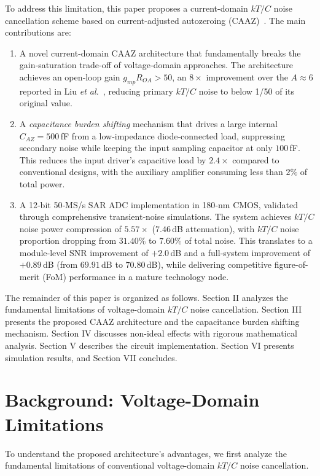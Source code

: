 \documentclass[journal]{IEEEtran}
\begin{document}
To address this limitation, this paper proposes a current-domain $kT/C$ noise cancellation scheme based on current-adjusted autozeroing (CAAZ)~\cite{safiallah2023caaz}. The main contributions are:
\begin{enumerate}
    \item A novel current-domain CAAZ architecture that fundamentally breaks the gain‑saturation trade‑off of voltage‑domain approaches. The architecture achieves an open‑loop gain $g_{mp}R_{OA}>50$, an $8\times$ improvement over the $A\approx6$ reported in Liu \textit{et al.}~\cite{liu202013bit}, reducing primary $kT/C$ noise to below 1/50 of its original value.
    
    \item A \textit{capacitance burden shifting} mechanism that drives a large internal $C_{AZ}=500$\,fF from a low‑impedance diode‑connected load, suppressing secondary noise while keeping the input sampling capacitor at only $100$\,fF. This reduces the input driver's capacitive load by $2.4\times$ compared to conventional designs, with the auxiliary amplifier consuming less than $2\%$ of total power.
    
    \item A 12‑bit 50‑MS/s SAR ADC implementation in 180‑nm CMOS, validated through comprehensive transient‑noise simulations. The system achieves $kT/C$ noise power compression of $5.57\times$ ($7.46$\,dB attenuation), with $kT/C$ noise proportion dropping from $31.40\%$ to $7.60\%$ of total noise. This translates to a module‑level SNR improvement of $+2.0$\,dB and a full‑system improvement of $+0.89$\,dB (from $69.91$\,dB to $70.80$\,dB), while delivering competitive figure-of-merit (FoM) performance in a mature technology node.
\end{enumerate}

The remainder of this paper is organized as follows. Section II analyzes the fundamental limitations of voltage-domain $kT/C$ noise cancellation. Section III presents the proposed CAAZ architecture and the capacitance burden shifting mechanism. Section IV discusses non-ideal effects with rigorous mathematical analysis. Section V describes the circuit implementation. Section VI presents simulation results, and Section VII concludes.

\section{Background: Voltage-Domain Limitations}
To understand the proposed architecture's advantages, we first analyze the fundamental limitations of conventional voltage-domain $kT/C$ noise cancellation.
\end{document}
